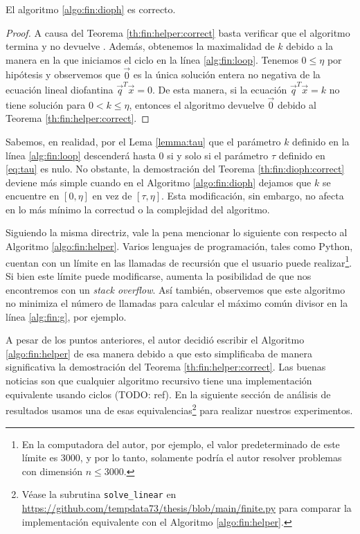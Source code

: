 \begin{theorem}
	\label{th:fin:dioph:correct}
	El algoritmo \ref{algo:fin:dioph} es correcto.
\end{theorem}
\begin{proof}
	A causa del Teorema \ref{th:fin:helper:correct} basta verificar que el algoritmo termina y no
	devuelve \NIL. Además, obtenemos la maximalidad de $k$ debido a la manera en la que iniciamos el
	ciclo en la línea \eqref{alg:fin:loop}. Tenemos $0 \leq \eta$ por hipótesis y observemos que
	$\vec{0}$ es la única solución entera no negativa de la ecuación lineal diofantina
	$\vec{q}^T\vec{x} = 0$. De esta manera, si la ecuación $\vec{q}^T\vec{x} = k$ no tiene solución
	para $0 < k \leq \eta$, entonces el algoritmo devuelve $\vec{0}$ debido al Teorema
	\ref{th:fin:helper:correct}.
\end{proof}

Sabemos, en realidad, por el Lema \ref{lemma:tau} que el parámetro $k$ definido en la línea
\eqref{alg:fin:loop} descenderá hasta 0 si y solo si el parámetro $\tau$ definido en \eqref{eq:tau}
es nulo. No obstante, la demostración del Teorema \ref{th:fin:dioph:correct} deviene más simple
cuando en el Algoritmo \ref{algo:fin:dioph} dejamos que $k$ se encuentre en $[0, \eta]$ en vez de
$[\tau, \eta]$. Esta modificación, sin embargo, no afecta en lo más mínimo la correctud o la
complejidad del algoritmo.

Siguiendo la misma directriz, vale la pena mencionar lo siguiente con respecto al Algoritmo
\ref{algo:fin:helper}. Varios lenguajes de programación, tales como Python, cuentan con un límite en
las llamadas de recursión que el usuario puede realizar\footnote{
	En la computadora del autor, por ejemplo, el valor predeterminado de este límite es 3000, y por
	lo tanto, solamente podría el autor resolver problemas con dimensión $n \leq 3000$.
}. Si bien este límite puede modificarse, aumenta la posibilidad de que nos encontremos con un
\textit{stack overflow}. Así también, observemos que este algoritmo no minimiza el número de
llamadas para calcular el máximo común divisor en la línea \eqref{alg:fin:g}, por ejemplo.

A pesar de los puntos anteriores, el autor decidió escribir el Algoritmo \ref{algo:fin:helper} de
esa manera debido a que esto simplificaba de manera significativa la demostración del Teorema
\ref{th:fin:helper:correct}. Las buenas noticias son que cualquier algoritmo recursivo tiene una
implementación equivalente usando ciclos (TODO: ref). En la siguiente sección de análisis de
resultados usamos una de esas equivalencias\footnote{
	Véase la subrutina \texttt{solve\_linear} en
	\url{https://github.com/tempdata73/thesis/blob/main/finite.py} para comparar la implementación
	equivalente con el Algoritmo \ref{algo:fin:helper}.
} para realizar nuestros experimentos.

